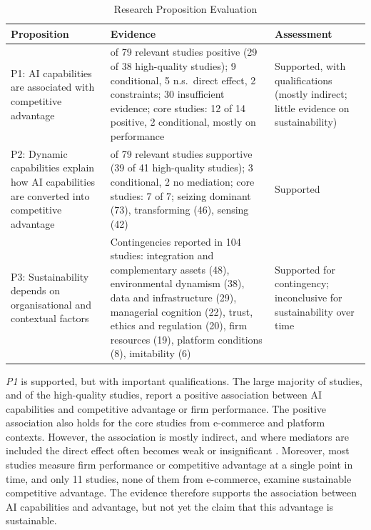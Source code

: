 \begin{table}[H]
  \centering
  \caption{Research Proposition Evaluation}
  \label{tab:propositions}
  \small{}\sloppy
  \begin{tabularx}{\textwidth}{>{\raggedright\arraybackslash}p{2.3cm}>{\raggedright\arraybackslash}X>{\raggedright\arraybackslash}p{2.8cm}}
    \toprule
    \textbf{Proposition} & \textbf{Evidence} & \textbf{Assessment} \\
    \midrule
    P1: AI capabilities are associated with competitive advantage & 63 of 79 relevant studies positive (29 of 38 high-quality studies); 9 conditional, 5 n.s.\ direct effect, 2 constraints; 30 insufficient evidence; core studies: 12 of 14 positive, 2 conditional, mostly on performance & Supported, with qualifications (mostly indirect; little evidence on sustainability) \\
    \addlinespace
    P2: Dynamic capabilities explain how AI capabilities are converted into competitive advantage & 74 of 79 relevant studies supportive (39 of 41 high-quality studies); 3 conditional, 2 no mediation; core studies: 7 of 7; seizing dominant (73), transforming (46), sensing (42) & Supported \\
    \addlinespace
    P3: Sustainability depends on organisational and contextual factors & Contingencies reported in 104 studies: integration and complementary assets (48), environmental dynamism (38), data and infrastructure (29), managerial cognition (22), trust, ethics and regulation (20), firm resources (19), platform conditions (8), imitability (6) & Supported for contingency; inconclusive for sustainability over time \\
    \bottomrule
  \end{tabularx}
\end{table}

\emph{P1} is supported, but with important qualifications. The large majority of studies, and of the high-quality studies, report a positive association between AI capabilities and competitive advantage or firm performance. The positive association also holds for the core studies from e-commerce and platform contexts. However, the association is mostly indirect, and where mediators are included the direct effect often becomes weak or insignificant \parencites[1]{slrR003}[1]{slrR011}[1]{wang2026}[1]{slrR120}[1]{slrR059}. Moreover, most studies measure firm performance or competitive advantage at a single point in time, and only 11 studies, none of them from e-commerce, examine sustainable competitive advantage. The evidence therefore supports the association between AI capabilities and advantage, but not yet the claim that this advantage is sustainable.

